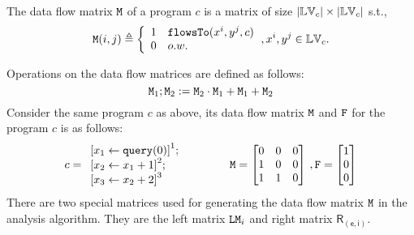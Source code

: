 %
%
\begin{defn}
The data flow matrix $\mathtt{M}$ of a program $c$ is a matrix of size $|\mathbb{LV}_c| \times |\mathbb{LV}_c|$ 
s.t.,
%
\[
\Mtrix(i, j) \triangleq
\left\{
\begin{array}{ll}
1	&	\flowsto({x^i, y^j, c}) \\
0	& o.w.
\end{array}
\right., {x^i}, y^j  \in \lvar_c.
\]
%
\end{defn}
%
Operations on the data flow matrices are defined as follows:
%
\begin{equation}
\mathtt{M}_1 ; \mathtt{M}_2 
:= \mathtt{M}_2 \cdot \mathtt{M}_1 + \mathtt{M}_1 + \mathtt{M}_2
\end{equation}
%
Consider the same program $c$ as above, its data flow matrix $\mathtt{M}$ and $\mathtt{F}$ for the program $c$ is as follows:
$$
{c} = 
\begin{array}{l}
\left[{\assign {x_1} {\query(0)}}	\right]^1;
\\
\left[{\assign {x_2} {x_1 + 1}}		\right]^2;
\\
\left[{\assign {x_3} {x_2 + 2}}		\right]^3
\end{array}
~~~~~~~~~~~~
\Mtrix
=  \left[ 
\begin{matrix}
0 & 0 & 0 \\
1 & 0 & 0 \\
1 & 1 & 0 \\
\end{matrix} \right] ~ , 
\flag = \left [ \begin{matrix}
1 \\
0 \\
0 \\
\end{matrix} \right ]
$$
%
There are two special matrices used for generating the data flow matrix $\mathtt{M}$ in the analysis algorithm. They are the left matrix $\mathtt{LM}_i$ and right matrix $\mathsf{R_{(e, i)}}$.

